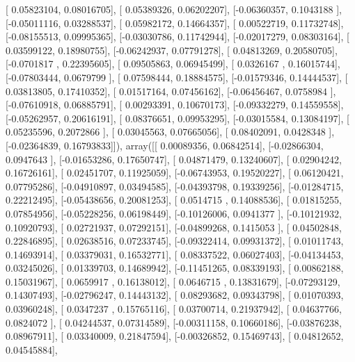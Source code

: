 \documentclass{article}
\begin{document}
       [ 0.05823104,  0.08016705],
       [ 0.05389326,  0.06202207],
       [-0.06360357,  0.1043188 ],
       [-0.05011116,  0.03288537],
       [ 0.05982172,  0.14664357],
       [ 0.00522719,  0.11732748],
       [-0.08155513,  0.09995365],
       [-0.03030786,  0.11742944],
       [-0.02017279,  0.08303164],
       [ 0.03599122,  0.18980755],
       [-0.06242937,  0.07791278],
       [ 0.04813269,  0.20580705],
       [-0.0701817 ,  0.22395605],
       [ 0.09505863,  0.06945499],
       [ 0.0326167 ,  0.16015744],
       [-0.07803444,  0.0679799 ],
       [ 0.07598444,  0.18884575],
       [-0.01579346,  0.14444537],
       [ 0.03813805,  0.17410352],
       [ 0.01517164,  0.07456162],
       [-0.06456467,  0.0758984 ],
       [-0.07610918,  0.06885791],
       [ 0.00293391,  0.10670173],
       [-0.09332279,  0.14559558],
       [-0.05262957,  0.20616191],
       [ 0.08376651,  0.09953295],
       [-0.03015584,  0.13084197],
       [ 0.05235596,  0.2072866 ],
       [ 0.03045563,  0.07665056],
       [ 0.08402091,  0.0428348 ],
       [-0.02364839,  0.16793833]]), array([[ 0.00089356,  0.06842514],
       [-0.02866304,  0.0947643 ],
       [-0.01653286,  0.17650747],
       [ 0.04871479,  0.13240607],
       [ 0.02904242,  0.16726161],
       [ 0.02451707,  0.11925059],
       [-0.06743953,  0.19520227],
       [ 0.06120421,  0.07795286],
       [-0.04910897,  0.03494585],
       [-0.04393798,  0.19339256],
       [-0.01284715,  0.22212495],
       [-0.05438656,  0.20081253],
       [ 0.0514715 ,  0.14088536],
       [ 0.01815255,  0.07854956],
       [-0.05228256,  0.06198449],
       [-0.10126006,  0.0941377 ],
       [-0.10121932,  0.10920793],
       [ 0.02721937,  0.07292151],
       [-0.04899268,  0.1415053 ],
       [ 0.04502848,  0.22846895],
       [ 0.02638516,  0.07233745],
       [-0.09322414,  0.09931372],
       [ 0.01011743,  0.14693914],
       [ 0.03379031,  0.16532771],
       [ 0.08337522,  0.06027403],
       [-0.04134453,  0.03245026],
       [ 0.01339703,  0.14689942],
       [-0.11451265,  0.08339193],
       [ 0.00862188,  0.15031967],
       [ 0.0659917 ,  0.16138012],
       [ 0.0646715 ,  0.13831679],
       [-0.07293129,  0.14307493],
       [-0.02796247,  0.14443132],
       [ 0.08293682,  0.09343798],
       [ 0.01070393,  0.03960248],
       [ 0.0347237 ,  0.15765116],
       [ 0.03700714,  0.21937942],
       [ 0.04637766,  0.0824072 ],
       [ 0.04244537,  0.07314589],
       [-0.00311158,  0.10660186],
       [-0.03876238,  0.08967911],
       [ 0.03340009,  0.21847594],
       [-0.00326852,  0.15469743],
       [ 0.04812652,  0.04545884],
\end{document}
